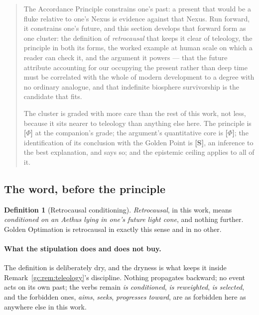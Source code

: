 \documentclass[11pt]{article}
\numberwithin{equation}{section}
\theoremstyle{plain}
\theoremstyle{definition}
\newtheorem{definition}[theorem]{Definition}
\theoremstyle{remark}
\begin{document}
\begin{quote}\small
The Accordance Principle constrains one's past: a present that would be
a fluke relative to one's Nexus is evidence against that Nexus. Run
forward, it constrains one's future, and this section develops that
forward form as one cluster: the definition of \emph{retrocausal} that
keeps it clear of teleology, the principle in both its forms, the
worked example at human scale on which a reader can check it, and the
argument it powers --- that the future attribute accounting for our
occupying the present rather than deep time must be correlated with the
whole of modern development to a degree with no ordinary analogue, and
that indefinite biosphere survivorship is the candidate that fits.

The cluster is graded with more care than the rest of this work, not
less, because it sits nearer to teleology than anything else here. The
principle is \textbf{[$\Phi$]} at the companion's grade; the argument's
quantitative core is \textbf{[$\Phi$]}; the identification of its
conclusion with the Golden Point is \textbf{[S]}, an inference to the
best explanation, and says so; and the epistemic ceiling applies to all
of it.
\end{quote}

\subsection{The word, before the principle}\label{ra:sub:definition}

\begin{definition}[Retrocausal conditioning]\label{gc:def:retrocausal}
\emph{Retrocausal}, in this work, means \emph{conditioned on an Aethus
lying in one's future light cone}, and nothing further. Golden
Optimation is retrocausal in exactly this sense and in no other.
\end{definition}

\paragraph{What the stipulation does and does not buy.}\label{gc:rem:retrocaution}
The definition is deliberately dry, and the dryness is what keeps it
inside Remark~\ref{gc:rem:teleology}'s discipline. Nothing propagates
backward; no event acts on its own past; the verbs remain \emph{is
conditioned}, \emph{is reweighted}, \emph{is selected}, and the
forbidden ones, \emph{aims}, \emph{seeks}, \emph{progresses toward}, are as forbidden here as anywhere else in this work.
\end{document}
